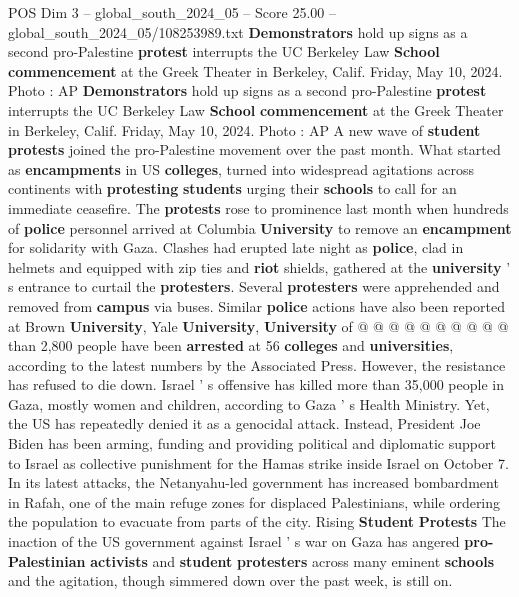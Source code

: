 \begin{textsample}{POS Dim 3 – global\_south\_2024\_05 – Score 25.00 – global\_south\_2024\_05/108253989.txt}  \label{ex:f3_pos_100}
\textbf{Demonstrators} hold up signs as a second pro-Palestine \textbf{protest} interrupts the UC Berkeley Law \textbf{School} \textbf{commencement} at the Greek Theater in Berkeley, Calif.
Friday, May 10, 2024.
Photo : AP \textbf{Demonstrators} hold up signs as a second pro-Palestine \textbf{protest} interrupts the UC Berkeley Law \textbf{School} \textbf{commencement} at the Greek Theater in Berkeley, Calif.
Friday, May 10, 2024.
Photo : AP A new wave of \textbf{student} \textbf{protests} joined the pro-Palestine movement over the past month.
What started as \textbf{encampments} in US \textbf{colleges}, turned into widespread agitations across continents with \textbf{protesting} \textbf{students} urging their \textbf{schools} to call for an immediate ceasefire.
The \textbf{protests} rose to prominence last month when hundreds of \textbf{police} personnel arrived at Columbia \textbf{University} to remove an \textbf{encampment} for solidarity with Gaza.
Clashes had erupted late night as \textbf{police}, clad in helmets and equipped with zip ties and \textbf{riot} shields, gathered at the \textbf{university} ' s entrance to curtail the \textbf{protesters}.
Several \textbf{protesters} were apprehended and removed from \textbf{campus} via buses.
Similar \textbf{police} actions have also been reported at Brown \textbf{University}, Yale \textbf{University}, \textbf{University} of @ @ @ @ @ @ @ @ @ @ than 2,800 people have been \textbf{arrested} at 56 \textbf{colleges} and \textbf{universities}, according to the latest numbers by the Associated Press.
However, the resistance has refused to die down.
Israel ' s offensive has killed more than 35,000 people in Gaza, mostly women and children, according to Gaza ' s Health Ministry.
Yet, the US has repeatedly denied it as a genocidal attack.
Instead, President Joe Biden has been arming, funding and providing political and diplomatic support to Israel as collective punishment for the Hamas strike inside Israel on October 7.
In its latest attacks, the Netanyahu-led government has increased bombardment in Rafah, one of the main refuge zones for displaced Palestinians, while ordering the population to evacuate from parts of the city.
Rising \textbf{Student} \textbf{Protests} The inaction of the US government against Israel ' s war on Gaza has angered \textbf{pro-Palestinian} \textbf{activists} and \textbf{student} \textbf{protesters} across many eminent \textbf{schools} and the agitation, though simmered down over the past week, is still on.

\end{textsample}

